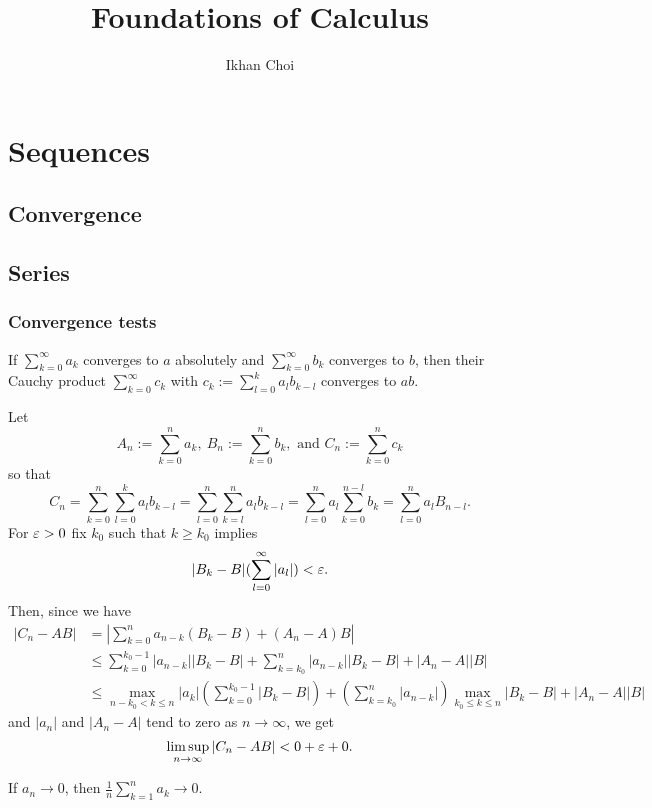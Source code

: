 \documentclass{../note}
\begin{document}
\title{Foundations of Calculus}
\author{Ikhan Choi}
\maketitle
\tableofcontents

\part{Sequences}
\chapter{Convergence}

\chapter{Series}
\section{Convergence tests}
\begin{prb}
If $\sum_{k=0}^\infty a_k$ converges to $a$ absolutely and $\sum_{k=0}^\infty b_k$ converges to $b$, then their Cauchy product $\sum_{k=0}^\infty c_k$ with $c_k:=\sum_{l=0}^ka_lb_{k-l}$ converges to $ab$.
\end{prb}
\begin{pf}
Let
\[A_n:=\sum_{k=0}^na_k,\ B_n:=\sum_{k=0}^nb_k, \text{ and } C_n:=\sum_{k=0}^nc_k\]
so that
\[C_n=\sum_{k=0}^n\sum_{l=0}^ka_lb_{k-l}=\sum_{l=0}^n\sum_{k=l}^na_lb_{k-l}=\sum_{l=0}^na_l\sum_{k=0}^{n-l}b_k=\sum_{l=0}^na_lB_{n-l}.\]
For $\varepsilon>0$ fix $k_0$ such that $k\ge k_0$ implies
\[|B_k-B|(\sum_{l=0}^\infty|a_l|)<\varepsilon.\]
Then, since we have
\begin{align*}
|C_n-AB|&=|\sum_{k=0}^na_{n-k}(B_k-B)+(A_n-A)B|\\
&\le\sum_{k=0}^{k_0-1}|a_{n-k}||B_k-B|+\sum_{k=k_0}^{n}|a_{n-k}||B_k-B|+|A_n-A||B|\\
&\le\max_{n-k_0<k\le n}|a_k|(\sum_{k=0}^{k_0-1}|B_k-B|)+(\sum_{k=k_0}^n|a_{n-k}|)\max_{k_0\le k\le n}|B_k-B|+|A_n-A||B|
\end{align*}
and $|a_n|$ and $|A_n-A|$ tend to zero as $n\to\infty$, we get
\[\limsup_{n\to\infty}|C_n-AB|<0+\varepsilon+0.\]
\end{pf}

\begin{prb}
\begin{parts}
\item If $a_n\to0$, then $\frac1n\sum_{k=1}^na_k\to0$.
\end{parts}
\end{prb}
\end{document}
